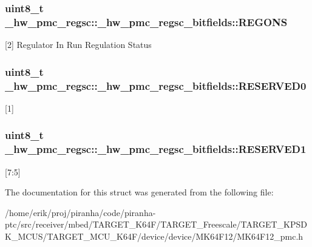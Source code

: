 \subsubsection[{\texorpdfstring{R\+E\+G\+O\+NS}{REGONS}}]{\setlength{\rightskip}{0pt plus 5cm}uint8\+\_\+t \+\_\+hw\+\_\+pmc\+\_\+regsc\+::\+\_\+hw\+\_\+pmc\+\_\+regsc\+\_\+bitfields\+::\+R\+E\+G\+O\+NS}\hypertarget{struct__hw__pmc__regsc_1_1__hw__pmc__regsc__bitfields_a259fa03c128c1501ac32458f135e58c0}{}\label{struct__hw__pmc__regsc_1_1__hw__pmc__regsc__bitfields_a259fa03c128c1501ac32458f135e58c0}
\mbox{[}2\mbox{]} Regulator In Run Regulation Status 
\subsubsection[{\texorpdfstring{R\+E\+S\+E\+R\+V\+E\+D0}{RESERVED0}}]{\setlength{\rightskip}{0pt plus 5cm}uint8\+\_\+t \+\_\+hw\+\_\+pmc\+\_\+regsc\+::\+\_\+hw\+\_\+pmc\+\_\+regsc\+\_\+bitfields\+::\+R\+E\+S\+E\+R\+V\+E\+D0}\hypertarget{struct__hw__pmc__regsc_1_1__hw__pmc__regsc__bitfields_a6d44bdcf4f259cc32c9d9b1047648509}{}\label{struct__hw__pmc__regsc_1_1__hw__pmc__regsc__bitfields_a6d44bdcf4f259cc32c9d9b1047648509}
\mbox{[}1\mbox{]} 
\subsubsection[{\texorpdfstring{R\+E\+S\+E\+R\+V\+E\+D1}{RESERVED1}}]{\setlength{\rightskip}{0pt plus 5cm}uint8\+\_\+t \+\_\+hw\+\_\+pmc\+\_\+regsc\+::\+\_\+hw\+\_\+pmc\+\_\+regsc\+\_\+bitfields\+::\+R\+E\+S\+E\+R\+V\+E\+D1}\hypertarget{struct__hw__pmc__regsc_1_1__hw__pmc__regsc__bitfields_a8d81d7cceae356f8c438c23253a6b2fb}{}\label{struct__hw__pmc__regsc_1_1__hw__pmc__regsc__bitfields_a8d81d7cceae356f8c438c23253a6b2fb}
\mbox{[}7\+:5\mbox{]} 

The documentation for this struct was generated from the following file\+:\begin{DoxyCompactItemize}
\item 
/home/erik/proj/piranha/code/piranha-\/ptc/src/receiver/mbed/\+T\+A\+R\+G\+E\+T\+\_\+\+K64\+F/\+T\+A\+R\+G\+E\+T\+\_\+\+Freescale/\+T\+A\+R\+G\+E\+T\+\_\+\+K\+P\+S\+D\+K\+\_\+\+M\+C\+U\+S/\+T\+A\+R\+G\+E\+T\+\_\+\+M\+C\+U\+\_\+\+K64\+F/device/device/\+M\+K64\+F12/M\+K64\+F12\+\_\+pmc.\+h\end{DoxyCompactItemize}
